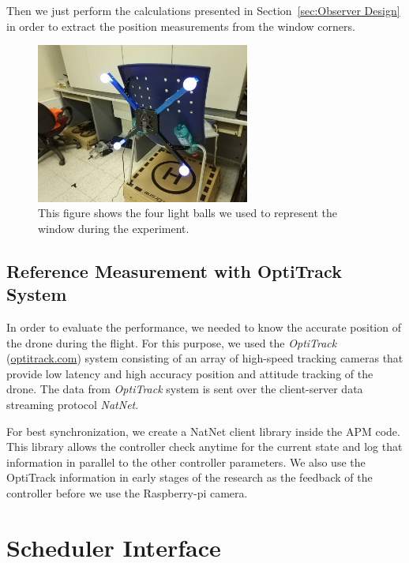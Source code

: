 \documentclass[ twoside, 12pt ]{article}
\begin{document}
Then we just perform the calculations presented in Section~\ref{sec:Observer Design} in order to extract the position measurements from the window corners.

\begin{figure} %
    \centerline{\includegraphics[width=70mm]{window_lights.jpg}}
    \caption{This figure shows the four light balls we used to represent the window during the experiment.}
    \label{fig:window_lights}
\end{figure}

\subsection{Reference Measurement with OptiTrack System}
In order to evaluate the performance, we needed to know the accurate position of the drone during the flight. For this purpose, we used the \textit{OptiTrack} (\url{optitrack.com}) system 
consisting of an array of high-speed tracking cameras that provide low latency and high accuracy position and attitude tracking of the drone. The data from \textit{OptiTrack} system is sent over the client-server data streaming protocol \textit{NatNet}.

For best synchronization, we create a NatNet client library inside the APM code. This library allows the controller check anytime for the current state and log that information in parallel to the other controller parameters.
We also use the OptiTrack information in early stages of the research as the feedback of the controller before we use the Raspberry-pi camera.

\section{Scheduler Interface}
\label{sec:scheduler}
\end{document}
